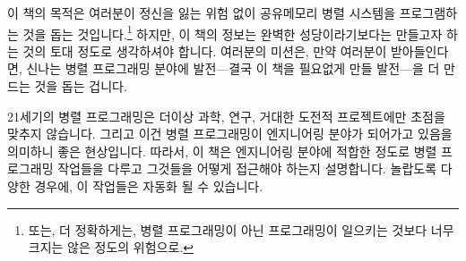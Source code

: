 
%

이 책의 목적은 여러분이 정신을 잃는 위험 없이 공유메모리 병렬 시스템을
프로그램하는 것을 돕는 것입니다.\footnote{
	또는, 더 정확하게는, 병렬 프로그래밍이 아닌 프로그래밍이 일으키는
	것보다 너무 크지는 않은 정도의 위험으로.}
하지만, 이 책의 정보는 완벽한 성당이라기보다는 만들고자 하는 것의 토대 정도로
생각하셔야 합니다.
여러분의 미션은, 만약 여러분이 받아들인다면, 신나는 병렬 프로그래밍 분야에
발전---결국 이 책을 필요없게 만들 발전---을 더 만드는 것을 돕는 겁니다.

\iffalse

The purpose of this book is to help you program
shared-memory parallel systems without risking your sanity.\footnote{
	Or, perhaps more accurately, without much greater risk to your
	sanity than that incurred by non-parallel programming.
	Which, come to think of it, might not be saying all that much.}
Nevertheless, you should think of the information in this book as a
foundation on which to build, rather than as a completed cathedral.
Your mission, if you choose to accept, is to help make further progress
in the exciting field of parallel programming---progress that will
in time render this book obsolete.

\fi

21세기의 병렬 프로그래밍은 더이상 과학, 연구, 거대한 도전적 프로젝트에만 초점을
맞추지 않습니다.
그리고 이건 병렬 프로그래밍이 엔지니어링 분야가 되어가고 있음을 의미하니 좋은
현상입니다.
따라서, 이 책은 엔지니어링 분야에 적합한 정도로 병렬 프로그래밍 작업들을 다루고
그것들을 어떻게 접근해야 하는지 설명합니다.
놀랍도록 다양한 경우에, 이 작업들은 자동화 될 수 있습니다.

\iffalse

Parallel programming in the 21\textsuperscript{st} century is no longer
focused solely on science, research, and grand-challenge projects.
And this is all to the good, because it means that parallel programming
is becoming an engineering discipline.
Therefore, as befits an engineering discipline, this book examines
specific parallel-programming tasks and describes how to approach them.
In some surprisingly common cases, these tasks can be automated.

\fi

